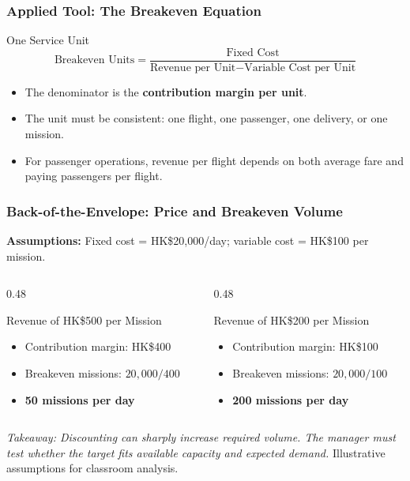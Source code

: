 \documentclass{beamer}
\begin{document}
\begin{frame}[t]
  \frametitle{Applied Tool: The Breakeven Equation}
  \begin{block}{One Service Unit}
  \[
    \text{Breakeven Units}
    =
    \frac{\text{Fixed Cost}}{\text{Revenue per Unit}-\text{Variable Cost per Unit}}
  \]
  \end{block}
  \begin{itemize}
    \item The denominator is the \textbf{contribution margin per unit}.
    \item The unit must be consistent: one flight, one passenger, one delivery, or one mission.
    \item For passenger operations, revenue per flight depends on both average fare and paying passengers per flight.
  \end{itemize}
\end{frame}

\begin{frame}[t,shrink=10]
  \frametitle{Back-of-the-Envelope: Price and Breakeven Volume}
  \textbf{Assumptions:} Fixed cost = HK\$20,000/day; variable cost = HK\$100 per mission.
  \begin{columns}[T]
    \begin{column}{0.48\textwidth}
      \begin{block}{Revenue of HK\$500 per Mission}
      \begin{itemize}
        \item Contribution margin: HK\$400
        \item Breakeven missions: $20{,}000/400$
        \item \textbf{50 missions per day}
      \end{itemize}
      \end{block}
    \end{column}
    \begin{column}{0.48\textwidth}
      \begin{block}{Revenue of HK\$200 per Mission}
      \begin{itemize}
        \item Contribution margin: HK\$100
        \item Breakeven missions: $20{,}000/100$
        \item \textbf{200 missions per day}
      \end{itemize}
      \end{block}
    \end{column}
  \end{columns}
  \textit{Takeaway: Discounting can sharply increase required volume. The manager must test whether the target fits available capacity and expected demand.}
  \vfill
  {\tiny Illustrative assumptions for classroom analysis.}
\end{frame}
\end{document}
